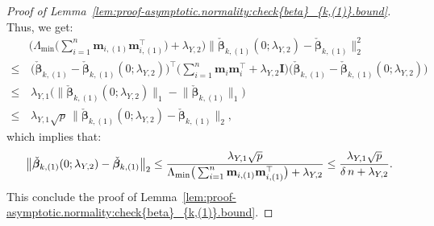 \documentclass[
  12pt]{article}
\def\M{\mathbf{m}}
\begin{document}
\begin{proof}[Proof of Lemma~\ref{lem:proof-asymptotic.normality:check{beta}_{k,(1)}.bound}]
	Thus, we get:  
	\begin{align*}
		&\Big( \Lambda_{\min} \big( \sum_{i=1}^{n} \M_{i,(1)} \M_{i,(1)}^{\top} \big)  + \lambda_{Y,2} \Big)  \big\|   \check{\bm{\beta}}_{k,(1)} (0;\lambda_{Y,2})      -   \check{\bm{\beta}}_{k,(1)}     \big\|_{2}^{2}   
		\\
		\leq  & \,   \Big( \check{\bm{\beta}}_{k,(1)}  - \check{\bm{\beta}}_{k,(1)} (0 ; \lambda_{Y,2})  \Big)^{\top}  
		\Big( \sum_{i=1}^{n}  \M_{i} \M_{i}^{\top}   
		+ \lambda_{Y,2} \mathbf{I}  \Big) 
		\Big( \check{\bm{\beta}}_{k,(1)}  - \check{\bm{\beta}}_{k,(1)} (0 ; \lambda_{Y,2})  \Big) 
		\\
		\leq  &  \,  \lambda_{Y,1}  \Big(   \big\|   \check{\bm{\beta}}_{k,(1)} (0;\lambda_{Y,2})    \big\|_{1}  -  \big\|   \check{\bm{\beta}}_{k,(1)}    \big\|_{1}   \Big)    
		\\
		\leq  &  \,  \lambda_{Y,1} \sqrt{p} \,  \big\|   \check{\bm{\beta}}_{k,(1)}  (0;\lambda_{Y,2})      -   \check{\bm{\beta}}_{k,(1)}    \big\|_{2},   
	\end{align*} 
	which implies that:
    \begin{align}
		\big\|   \check{\bm{\beta}}_{k,(1)} (0;\lambda_{Y,2})      -   \check{\bm{\beta}}_{k,(1)}    \big\|_{2}  
		\leq   \dfrac{ \lambda_{Y,1} \sqrt{p} }{  \Lambda_{\min} \big(  \sum_{i=1}^{n} \M_{i,(1)} \M_{i,(1)}^{\top} \big)  + \lambda_{Y,2} }  
		\leq  \dfrac{ \lambda_{Y,1} \sqrt{p} }{\delta \, n + \lambda_{Y,2}}.  
		\label{proof:lem:proof-asymptotic.normality:check{beta}_{k,(1)}.bound}
	\end{align}    
	This conclude the proof of Lemma~\ref{lem:proof-asymptotic.normality:check{beta}_{k,(1)}.bound}. 
\end{proof}
\end{document}
